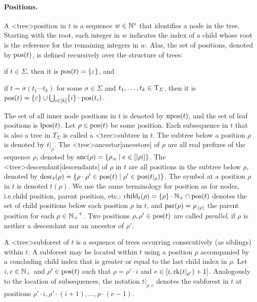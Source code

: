 \documentclass[../document.tex]{subfiles}
\begin{document}
    \paragraph{Positions.}
    A <tree>{position} in \(t\) is a sequence $w \in \mathbb{N}^*$ that identifies a node in the tree.
    Starting with the root, each integer in \(w\) indicates the index of a child whose root is the reference for the remaining integers in \(w\).
    Alas, the set of positions, denoted by \(\operatorname{pos}(t)\), is defined recursively over the structure of trees:
    \begin{inparaenum}
        \item if \(t \in \varSigma\), then it is \(\operatorname{pos}(t) = \{\varepsilon\}\), and
        \item if \(t = \sigma(t_1 \cdots t_k)\) for some \(\sigma\in \varSigma\) and \(t_1, \ldots, t_k \in \operatorname{T}_\varSigma\), then it is \(\operatorname{pos}(t) = \{\varepsilon\} \cup \bigcup_{i\in[k]} \{i\}\cdot \operatorname{pos}(t_i)\).
    \end{inparaenum}
    The set of all inner node positions in \(t\) is denoted by \(\operatorname{npos}(t)\), and the set of leaf positions is \(\operatorname{lpos}(t)\).
    Let \(\rho \in \operatorname{pos}(t)\) be some position.
    Each subsequence in \(t\) that is also a tree in \(T_\varSigma\) is called a <tree>{subtree} in \(t\).
    The subtree below a position \(\rho\) is denoted by \(t|_\rho\).
    The <tree>{ancestor}[ancestors] of \(\rho\) are all real prefixes of the sequence \(\rho\), denoted by \(\operatorname{anc}(\rho) = \{ \rho_{:e} \mid e \in [|\rho|] \}\).
    The <tree>{descendant}[descendants] of \(\rho\) in \(t\) are all positions in the subtree below \(\rho\), denoted by \(\operatorname{desc}_t(\rho) = \{ \rho \cdot \rho' \in \operatorname{pos}(t) \mid \rho' \in \operatorname{pos}(t|_\rho) \}\).
    The symbol at a position \(\rho\) in \(t\) is denoted  \(t(\rho)\).
    We use the same terminology for position as for nodes, i.e.\@ child position, parent position, etc.; \(\operatorname{child}_t(\rho) = \{\rho\} \cdot \mathbb{N}_+ \cap \operatorname{pos}(t)\) denotes the set of child positions below each position \(\rho\) in \(t\), and \(\operatorname{par}(\rho) = \rho_{:|\rho|}\) the parent position for each \(\rho \in {\ensuremath{\mathbb{N}}_+}^+\).
    Two positions \(\rho, \rho' \in \operatorname{pos}(t)\) are called \emph{parallel}, if \(\rho\) is neither a descendant nor an ancestor of \(\rho'\).

    A <tree>{subforest} of \(t\) is a sequence of trees occurring consecutively (as siblings) within \(t\).
    A subforest may be located within \(t\) using a position \(\rho\) accompanied by a concluding child index that is greater or equal to the last child index in \(\rho\).
    Let \(i, e \in \mathbb{N}_+\) and \(\rho' \in \operatorname{pos}(t)\) such that \(\rho = \rho' \cdot i\) and \(e \in [i,\operatorname{rk}(t|_{\rho'})+1]\).
    Analogously to the location of subsequences, the notation \(t|_{\rho:e}\) denotes the subforest in \(t\) at positions \(\rho' \cdot i, \rho' \cdot (i+1), \ldots, \rho \cdot (e-1)\).
\end{document}
